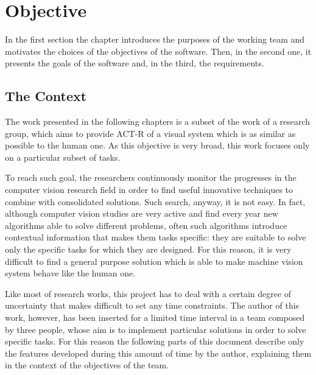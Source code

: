 \chapter{Objective}\label{chObjective}
	In the first section the chapter introduces the purposes of the working team and motivates the choices of the objectives of the software. Then, in the second one, it presents the goals of the software and, in the third, the requirements.
 

	\section{The Context}
	The work presented in the following chapters is a subset of the work of a research group, which aims to provide \mbox{ACT-R} of a visual system which is as similar as possible to the human one. 
	As this objective is very broad, this work focuses only on a particular subset of tasks.


	To reach such goal, the researchers continuously monitor the progresses in the computer vision research field in order to find useful innovative techniques to combine with consolidated solutions. 
	Such search, anyway, it is not easy. In fact, although computer vision studies are very active and find every year new algorithms able to solve different problems, often such algorithms introduce contextual information that makes them tasks specific: they are suitable to solve only the specific tasks for which they are designed. 
	For this reason, it is very difficult to find a general purpose solution which is able to make machine vision system behave like the human one.


	Like most of research works, this project has to deal with a certain degree of uncertainty that makes difficult to set any time constraints.
	The author of this work, however, has been inserted for a limited time interval in a team composed by three people, whose aim is to implement particular solutions in order to solve specific tasks. 
	For this reason the following parts of this document describe only the features developed during this amount of time by the author, explaining them in the context of the objectives of the team. 
	
